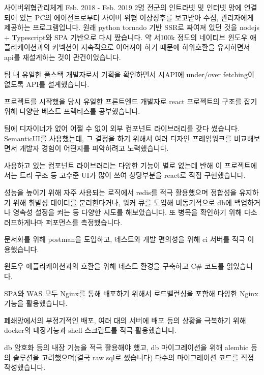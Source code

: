 

\begin{cvprojects}

  \cvproject
    {사이버위협관리체계} %
  	{Feb. 2018 - Feb. 2019} %
  	{2명} %
  	{
  	  전군의 인트라넷 및 인터넷 망에 연결되어 있는 PC의 에이전트로부터 사이버 위협 이상징후를 보고받아 수집, 관리자에게 제공하는 프로그램입니다. 원래 python tornado 기반 SSR로 짜여져 있던 것을 nodejs + Typescript와 SPA 기반으로 다시 짰습니다. 약 서100k 정도의 네이티브 윈도우 애플리케이션과의 커넥션이 지속적으로 이어져야 하기 때문에 하위호환을 유지하면서 api를 재설계하는 것이 관건이었습니다.
  	} %
  	{
  		\begin{cvitems}
  		  \item{팀 내 유일한 풀스택 개발자로서 기획을 확인하면서 시API에 under/over fetching이 없도록 API를 설계했습니다. }
  		  \item{프로젝트를 시작했을 당시 유일한 프론트엔드 개발자로 react 프로젝트의 구조를 잡기 위해 다양한 베스트 프랙티스를 공부했습니다.}
   		  \item{팀에 디자이너가 없어 어쩔 수 없이 외부 컴포넌트 라이브러리를 갖다 썼습니다. SemanticUI를 사용했는데, 그 결정을 하기 위해서 여러 디자인 프레임워크를 비교해보면서 개발자 경험이 어떤지를 파악하려고 노력했습니다.}
   		  \item{사용하고 있는 컴포넌트 라이브러리는 다양한 기능이 별로 없는데 반해 이 프로젝트에서는 트리 구조 등 고수준 UI가 많이 쓰여 상당부분을 react로 직접 구현했습니다.}
  		  \item{성능을 높이기 위해 자주 사용되는 로직에서 redis를 적극 활용했으며 정합성을 유지하기 위해 휘발성 데이터를 분리한다거나, 워커 큐를 도입해 비동기적으로 db에 백업하거나 영속성 설정을 켜는 등 다양한 시도를 해보았습니다. 또 병목을 확인하기 위해 다소 러프하게나마 퍼포먼스를 측정했습니다.}
  		  \item{문서화를 위해 postman을 도입하고, 테스트와 개발 편의성을 위해 ci 서버를 적극 이용했습니다.}
  		  \item{윈도우 애플리케이션과의 호환을 위해 테스트 환경을 구축하고 C\# 코드를 읽었습니다.}
   		  \item{SPA와 WAS 모두 Nginx를 통해 배포하기 위해서 로드밸런싱을 포함해 다양한 Nginx 기능을 활용했습니다.}
   		  \item{폐쇄망에서의 부정기적인 배포, 여러 대의 서버에 배포 등의 상황을 극복하기 위해 docker의 내장기능과 shell 스크립트를 적극 활용했습니다.}
   		  \item{db 암호화 등의 내장 기능을 적극 활용해야 했고, db 마이그레이션을 위해 alembic 등의 솔루션을 고려했으며(결국 raw sql로 썼습니다) 다수의 마이그레이션 코드를 직접 작성했습니다.}
  		\end{cvitems}
  	} %
  	{} %
 

\end{cvprojects}
